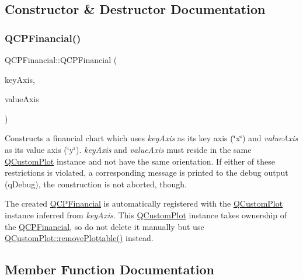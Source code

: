 \subsection{Constructor \& Destructor Documentation}
\mbox{\label{class_q_c_p_financial_a4702d5248feeb9d1ec6e3ce725b10b32}} 
\subsubsection{\texorpdfstring{Q\+C\+P\+Financial()}{QCPFinancial()}}
{\footnotesize\ttfamily Q\+C\+P\+Financial\+::\+Q\+C\+P\+Financial (\begin{DoxyParamCaption}\item[{\mbox{\hyperlink{class_q_c_p_axis}{Q\+C\+P\+Axis}} $\ast$}]{key\+Axis,  }\item[{\mbox{\hyperlink{class_q_c_p_axis}{Q\+C\+P\+Axis}} $\ast$}]{value\+Axis }\end{DoxyParamCaption})\hspace{0.3cm}{\ttfamily [explicit]}}

Constructs a financial chart which uses {\itshape key\+Axis} as its key axis (\char`\"{}x\char`\"{}) and {\itshape value\+Axis} as its value axis (\char`\"{}y\char`\"{}). {\itshape key\+Axis} and {\itshape value\+Axis} must reside in the same \mbox{\hyperlink{class_q_custom_plot}{Q\+Custom\+Plot}} instance and not have the same orientation. If either of these restrictions is violated, a corresponding message is printed to the debug output (q\+Debug), the construction is not aborted, though.

The created \mbox{\hyperlink{class_q_c_p_financial}{Q\+C\+P\+Financial}} is automatically registered with the \mbox{\hyperlink{class_q_custom_plot}{Q\+Custom\+Plot}} instance inferred from {\itshape key\+Axis}. This \mbox{\hyperlink{class_q_custom_plot}{Q\+Custom\+Plot}} instance takes ownership of the \mbox{\hyperlink{class_q_c_p_financial}{Q\+C\+P\+Financial}}, so do not delete it manually but use \mbox{\hyperlink{class_q_custom_plot_af3dafd56884208474f311d6226513ab2}{Q\+Custom\+Plot\+::remove\+Plottable()}} instead. 

\subsection{Member Function Documentation}
\mbox{\label{class_q_c_p_financial_a372ac031e44a7a6c912d203556af96f7}} 
